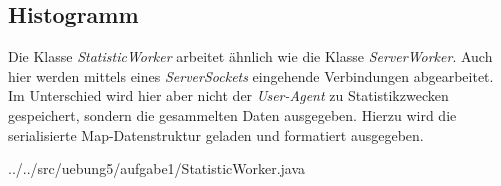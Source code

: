 \subsection*{Histogramm}
Die Klasse \textit{StatisticWorker} arbeitet ähnlich wie die Klasse \textit{ServerWorker}.
Auch hier werden mittels eines \textit{ServerSockets} eingehende Verbindungen abgearbeitet.
Im Unterschied wird hier aber nicht der \textit{User-Agent} zu Statistikzwecken gespeichert,
sondern die gesammelten Daten ausgegeben.
Hierzu wird die serialisierte Map-Datenstruktur geladen und formatiert ausgegeben.

{../../src/uebung5/aufgabe1/StatisticWorker.java}
